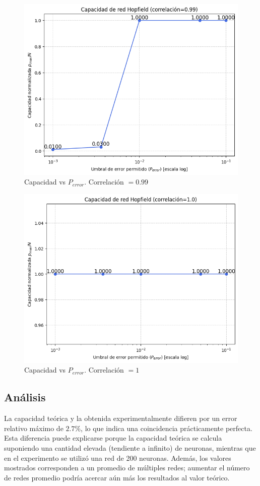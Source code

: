 \documentclass[11pt]{article} %
\begin{document}
\begin{figure}[h!]
    \centering
    \includegraphics[width=0.8\linewidth]{imgs/corr099.png}
    \caption{Capacidad vs $P_{error}$. Correlación $= 0.99$}
    \label{img-0.99}
\end{figure}


\begin{figure}[h!]
    \centering
    \includegraphics[width=0.8\linewidth]{imgs/ej2_2_5.png}
    \caption{Capacidad vs $P_{error}$. Correlación $= 1$}
    \label{fig:ej2_2_5}
\end{figure}

\clearpage
\newpage

\subsection{Análisis}

La capacidad teórica y la obtenida experimentalmente difieren por un error relativo máximo de $2.7 \%$, lo que indica una coincidencia prácticamente perfecta. Esta diferencia puede explicarse porque la capacidad teórica se calcula suponiendo una cantidad elevada (tendiente a infinito) de neuronas, mientras que en el experimento se utilizó una red de 200 neuronas. Además, los valores mostrados corresponden a un promedio de múltiples redes; aumentar el número de redes promedio podría acercar aún más los resultados al valor teórico.
\end{document}
